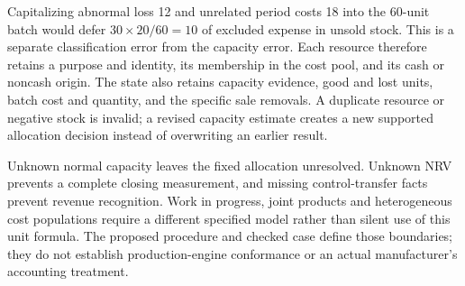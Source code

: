 Capitalizing abnormal loss 12 and unrelated period costs 18 into the
60-unit batch would defer \(30\times20/60=10\) of excluded expense
in unsold stock. This is a separate classification error from the
capacity error. Each resource therefore retains a purpose and identity,
its membership in the cost pool, and its cash or noncash origin. The
state also retains capacity evidence, good and lost units, batch cost
and quantity, and the specific sale removals. A duplicate resource or
negative stock is invalid; a revised capacity estimate creates a new
supported allocation decision instead of overwriting an earlier result.

Unknown normal capacity leaves the fixed allocation unresolved. Unknown
NRV prevents a complete closing measurement, and missing control-transfer
facts prevent revenue recognition. Work in progress, joint products and
heterogeneous cost populations require a different specified model rather
than silent use of this unit formula. The proposed procedure and checked
case define those boundaries; they do not establish production-engine
conformance or an actual manufacturer's accounting treatment.
